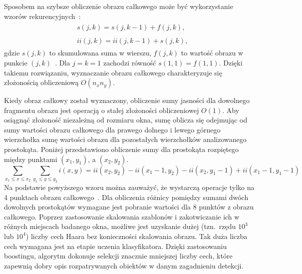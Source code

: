 Sposobem na szybsze obliczenie obrazu całkowego może być wykorzystanie wzorów rekurencyjnych~\cite{990517,10.1145/800031.808600}:
\begin{align}
    &\begin{aligned}
         s(j,k)=s(j, k-1)+f(j,k),
    \end{aligned}\\
    &\begin{aligned}
         ii(j,k)=ii(j,k-1)+s(j,k),
    \end{aligned}
\end{align}
gdzie $s(j,k)$ to skumulowana suma w wierszu, $f(j,k)$ to wartość obrazu w punkcie $(j,k)$~\cite{990517}.
Dla $j=k=1$ zachodzi równość $s(1,1)=f(1,1)$.
Dzięki takiemu rozwiązaniu, wyznaczanie obrazu całkowego charakteryzuje się złożonością obliczeniową $O(n_x n_y)$.

Kiedy obraz całkowy został wyznaczony, obliczenie sumy jasności dla dowolnego fragmentu obrazu jest operacją o stałej złożoności obliczeniowej $O(1)$.
Aby osiągnąć złożoność niezależną od rozmiaru okna, sumę oblicza się odejmując od sumy wartości obrazu całkowego dla prawego dolnego i lewego górnego wierzchołka sumę wartości obrazu dla pozostałych wierzchołków analizowanego prostokąta.
Poniżej przedstawiono obliczenie sumy dla prostokąta rozpiętego między punktami $(x_1, y_1)$, a $(x_2, y_2)$.
\begin{equation}
    \label{eq:integral_image_x_y}
    \sum_{x_1\leq x \leq x_2} \sum_{y_1\leq y \leq y_2} i(x,y) = ii(x_2, y_2) - ii(x_1 - 1, y_2) - ii(x_2, y_1 - 1) + ii(x_1 - 1, y_1 - 1)
\end{equation}
Na podstawie powyższego wzoru można zauważyć, że wystarczą operacje tylko na 4 punktach obrazu całkowego~\cite{szybka_detekcja_klesk}.
Dla obliczenia różnicy pomiędzy sumami dwóch dowolnych prostokątów wymagane jest pobranie wartości dla 8 punktów z obrazu całkowego.
Poprzez zastosowanie skalowania szablonów i zakotwiczanie ich w różnych miejscach badanego okna, możliwe jest uzyskanie dużej (tzn.\ rzędu $10^3$ lub $10^4$) liczby cech Haara bez konieczności skalowania obrazu.
Tak duża liczba cech wymagana jest na etapie uczenia klasyfikatora.
Dzięki zastosowaniu boostingu, algorytm dokonuje selekcji znacznie mniejszej liczby cech, które zapewnią dobry opis rozpatrywanych obiektów w danym zagadnieniu detekcji.

